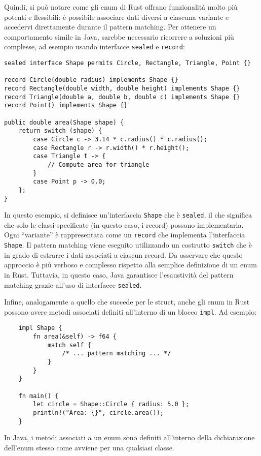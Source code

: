 Quindi, si può notare come gli enum di Rust offrano funzionalità molto più potenti e flessibili: è possibile associare dati diversi a ciascuna variante e accedervi direttamente durante il pattern matching. Per ottenere un comportamento simile in Java, sarebbe necessario ricorrere a soluzioni più complesse, ad esempio usando interfacce \texttt{sealed} e \texttt{record}:
\begin{verbatim}
sealed interface Shape permits Circle, Rectangle, Triangle, Point {}

record Circle(double radius) implements Shape {}
record Rectangle(double width, double height) implements Shape {}
record Triangle(double a, double b, double c) implements Shape {}
record Point() implements Shape {}

public double area(Shape shape) {
    return switch (shape) {
        case Circle c -> 3.14 * c.radius() * c.radius();
        case Rectangle r -> r.width() * r.height();
        case Triangle t -> {
            // Compute area for triangle
        }
        case Point p -> 0.0;
    };
}
\end{verbatim}
In questo esempio, si definisce un'interfaccia \texttt{Shape} che è \texttt{sealed}, il che significa che solo le classi specificate (in questo caso, i record) possono implementarla. Ogni ``variante'' è rappresentata come un \texttt{record} che implementa l'interfaccia \texttt{Shape}. Il pattern matching viene eseguito utilizzando un costrutto \texttt{switch} che è in grado di estrarre i dati associati a ciascun record. Da osservare che questo approccio è più verboso e complesso rispetto alla semplice definizione di un enum in Rust. Tuttavia, in questo caso, Java garantisce l'esaustività del pattern matching grazie all'uso di interfacce \texttt{sealed}.

Infine, analogamente a quello che succede per le struct, anche gli enum in Rust possono avere metodi associati definiti all'interno di un blocco \texttt{impl}. Ad esempio:
\begin{verbatim}
    impl Shape {
        fn area(&self) -> f64 {
            match self {
                /* ... pattern matching ... */
            }
        }
    }

    fn main() {
        let circle = Shape::Circle { radius: 5.0 };
        println!("Area: {}", circle.area());
    }
\end{verbatim}
In Java, i metodi associati a un enum sono definiti all'interno della dichiarazione dell'enum stesso come avviene per una qualsiasi classe.